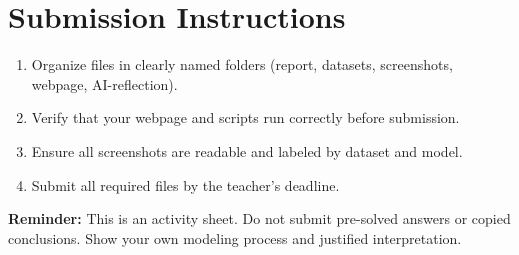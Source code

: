 	\section{Submission Instructions}
	\begin{enumerate}
		\item Organize files in clearly named folders (report, datasets, screenshots, webpage, AI-reflection).
		\item Verify that your webpage and scripts run correctly before submission.
		\item Ensure all screenshots are readable and labeled by dataset and model.
		\item Submit all required files by the teacher's deadline.
	\end{enumerate}
	
	\vspace{0.2cm}
	\textbf{Reminder:} This is an activity sheet. Do not submit pre-solved answers or copied conclusions. Show your own modeling process and justified interpretation.


